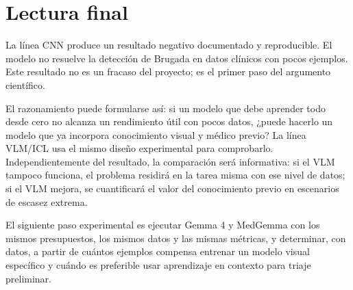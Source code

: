 \section{Lectura final}

La línea CNN produce un resultado negativo documentado y reproducible. El modelo no resuelve la detección de Brugada en datos clínicos con pocos ejemplos. Este resultado no es un fracaso del proyecto; es el primer paso del argumento científico.

El razonamiento puede formularse así: si un modelo que debe aprender todo desde cero no alcanza un rendimiento útil con pocos datos, ¿puede hacerlo un modelo que ya incorpora conocimiento visual y médico previo? La línea VLM/ICL usa el mismo diseño experimental para comprobarlo. Independientemente del resultado, la comparación será informativa: si el VLM tampoco funciona, el problema residirá en la tarea misma con ese nivel de datos; si el VLM mejora, se cuantificará el valor del conocimiento previo en escenarios de escasez extrema.

El siguiente paso experimental es ejecutar Gemma 4 y MedGemma con los mismos presupuestos, los mismos datos y las mismas métricas, y determinar, con datos, a partir de cuántos ejemplos compensa entrenar un modelo visual específico y cuándo es preferible usar aprendizaje en contexto para triaje preliminar.
